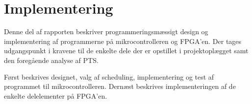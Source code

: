 \part{Implementering}
Denne del af rapporten beskriver programmeringsmæssigt design og implementering af programmerne
på mikrocontrolleren og FPGA'en.
Der tages udgangspunkt i kravene til de enkelte dele der er opstillet i projektoplægget samt den foregående analyse af PTS.

Først beskrives designet, valg af scheduling,
implementering og test af programmet til mikrocontrolleren.
Dernæst beskrives implementeringen af de enkelte delelementer på FPGA'en.


%
